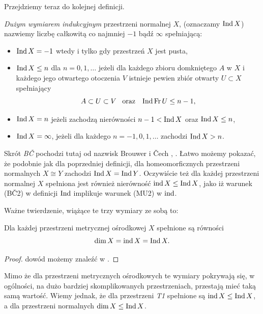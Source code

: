 Przejdziemy teraz do kolejnej definicji.
\begin{defi}
    \emph{Dużym wymiarem indukcyjnym} przestrzeni normalnej $X$, (oznaczamy $\operatorname{Ind} X$) nazwiemy liczbę całkowitą co najmniej $-1$ bądź $\infty$ spełniającą:
    \begin{itemize}
        \item[(BČ1)] $\operatorname{Ind} X = -1$ wtedy i tylko gdy przestrzeń $X$ jest pusta,
        \item[(BČ2)] $\operatorname{Ind} X\le n$ dla $n=0,1,\ldots$ jeżeli dla każdego zbioru domkniętego $A$ w $X$ i każdego jego otwartego otoczenia $V$ istnieje pewien zbiór otwarty $U\subset X$ spełniający
        \[A\subset  U\subset V\;\;\;\mathrm{oraz}\;\;\; \operatorname{Ind} \operatorname{Fr} U \le n-1,\]
        \item[(BČ3)] $\operatorname{Ind} X=n$ jeżeli zachodzą nierówności $n-1<\operatorname{Ind} X $ oraz $\operatorname{Ind} X \le n$,
        \item[(BČ4)] $\operatorname{Ind} X=\infty$, jeżeli dla każdego $n=-1,0,1,\ldots$ zachodzi $\operatorname{Ind} X >n$.
    \end{itemize}
\end{defi}
Skrót \emph{BČ} pochodzi tutaj od nazwisk Brouwer i Čech \cite{bro1913}, \cite{cech1993}. 
Łatwo możemy pokazać, że podobnie jak dla poprzedniej definicji, dla homeomorficznych przestrzeni normalnych $X\cong Y$ zachodzi $\operatorname{Ind} X=\operatorname{Ind} Y$. Oczywiście też dla każdej przestrzeni normalnej $X$ spełniona jest również nierówność $\operatorname{ind} X\le \operatorname{Ind} X$, 
jako iż warunek (BČ2) w definicji $\operatorname{Ind}$ implikuje warunek (MU2) w $\operatorname{ind}$.

Ważne twierdzenie, wiążące te trzy wymiary ze sobą to:
\begin{twie}
    Dla każdej przestrzeni metrycznej ośrodkowej $X$ spełnione są równości
    \[\dim X = \operatorname{ind} X = \operatorname{Ind} X.\]
\end{twie}
\begin{proof}
    dowód możemy znaleźć w \cite{hurewicz1941}.
\end{proof}
Mimo że dla przestrzeni metrycznych ośrodkowych te wymiary pokrywają się, w ogólności, na dużo bardziej skomplikowanych przestrzeniach, przestają mieć taką samą wartość.
Wiemy jednak, że dla przestrzeni \emph{T1} spełnione są $\operatorname{ind} X \le \operatorname{Ind} X$, a dla przestrzeni normalnych $\dim X\le \operatorname{Ind} X$.
